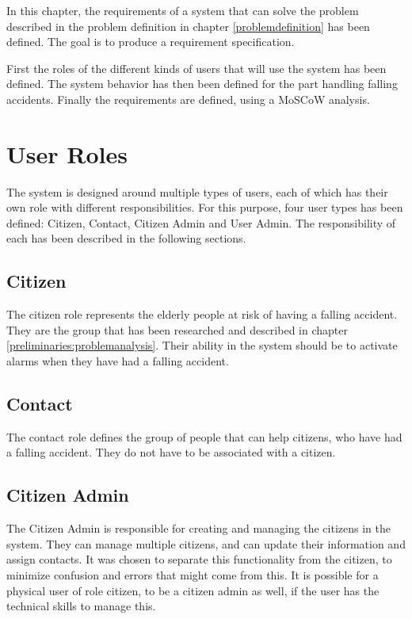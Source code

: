In this chapter, the requirements of a system that can solve the problem described in the problem definition in chapter \ref{problemdefinition} has been defined. The goal is to produce a requirement specification.

First the roles of the different kinds of users that will use the system has been defined. The system behavior has then been defined for the part handling falling accidents. Finally the requirements are defined, using a MoSCoW analysis.

\section{User Roles}\label{sec:user-roles}
The system is designed around multiple types of users, each of which has their own role with different responsibilities. For this purpose, four user types has been defined: Citizen, Contact, Citizen Admin and User Admin. The responsibility of each has been described in the following sections.

\subsection{Citizen}
The citizen role represents the elderly people at risk of having a falling accident. They are the group that has been researched and described in chapter \ref{preliminaries:problemanalysis}. Their ability in the system should be to activate alarms when they have had a falling accident.

\subsection{Contact}
The contact role defines the group of people that can help citizens, who have had a falling accident. They do not have to be associated with a citizen.

\subsection{Citizen Admin}
The Citizen Admin is responsible for creating and managing the citizens in the system. They can manage multiple citizens, and can update their information and assign contacts. It was chosen to separate this functionality from the citizen, to minimize confusion and errors that might come from this. It is possible for a physical user of role citizen, to be a citizen admin as well, if the user has the technical skills to manage this.

